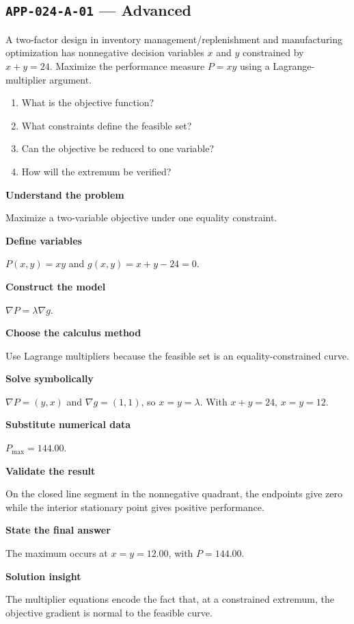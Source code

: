 \documentclass[11pt]{book}
\newcommand{\pid}[1]{\texttt{#1}}
\begin{document}
\subsection*{\pid{APP-024-A-01} — Advanced}
\begin{problembox}
A two-factor design in inventory management/replenishment and manufacturing optimization has nonnegative decision variables $x$ and $y$ constrained by $x+y=24$. Maximize the performance measure $P=xy$ using a Lagrange-multiplier argument.
\end{problembox}
\begin{promptbox}\begin{enumerate}
\item What is the objective function?
\item What constraints define the feasible set?
\item Can the objective be reduced to one variable?
\item How will the extremum be verified?
\end{enumerate}\end{promptbox}
\begin{solutionbox}
\textbf{Understand the problem}\par Maximize a two-variable objective under one equality constraint.\par\medskip
\textbf{Define variables}\par $P(x,y)=xy$ and $g(x,y)=x+y-24=0$.\par\medskip
\textbf{Construct the model}\par $\nabla P=\lambda\nabla g$.\par\medskip
\textbf{Choose the calculus method}\par Use Lagrange multipliers because the feasible set is an equality-constrained curve.\par\medskip
\textbf{Solve symbolically}\par $\nabla P=(y,x)$ and $\nabla g=(1,1)$, so $x=y=\lambda$. With $x+y=24$, $x=y=12$.\par\medskip
\textbf{Substitute numerical data}\par $P_{\max}=144.00$.\par\medskip
\textbf{Validate the result}\par On the closed line segment in the nonnegative quadrant, the endpoints give zero while the interior stationary point gives positive performance.\par\medskip
\textbf{State the final answer}\par The maximum occurs at $x=y=12.00$, with $P=144.00$.\par\medskip
\textbf{Solution insight}\par The multiplier equations encode the fact that, at a constrained extremum, the objective gradient is normal to the feasible curve.\par\medskip
\end{solutionbox}
\end{document}
